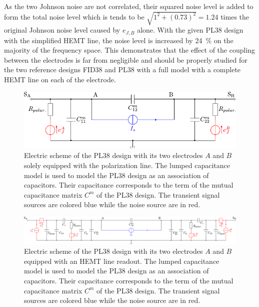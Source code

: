 As the two Johnson noise are not correlated, their squared noise level is added to form the total noise level which is tends to be $\sqrt{1^2 + (0.73)^2} = 1.24$ times the original Johnson noise level caused by $e_{J,B}$ alone. With the given PL38 design with the simplified HEMT line, the noise level is increased by \SI{24}{\percent} on the majority of the frequency space. This demonstrates that the effect of the coupling between the electrodes is far from negligible and should be properly studied for the two reference designs FID38 and PL38 with a full model with a complete HEMT line on each of the electrode.

\begin{landscape}

\begin{figure}
\centering
\includegraphics[scale=1]{Figures/Electrodes/pl38_analytical_circuit.pdf}
\caption{Electric scheme of the PL38 design with its two electrodes $A$ and $B$ solely equipped with the polarization line. The lumped capacitance model is used to model the PL38 design as an association of capacitors. Their capacitance corresponds to the term of the mutual capacitance matrix $C^m$ of the PL38 design. The transient signal sources are colored blue while the noise source are in red.}
\label{fig:pl38-analytical-circuit}
\end{figure}

\begin{figure}
\centering
\includegraphics[scale=1]{Figures/Electrodes/pl38_full_circuit.pdf}
\caption{Electric scheme of the PL38 design with its two electrodes $A$ and $B$ equipped with an HEMT line readout. The lumped capacitance model is used to model the PL38 design as an association of capacitors. Their capacitance corresponds to the term of the mutual capacitance matrix $C^m$ of the PL38 design. The transient signal sources are colored blue while the noise source are in red.}
\label{fig:pl38-full-circuit}
\end{figure}

\end{landscape}

